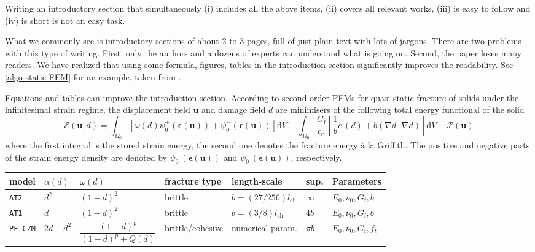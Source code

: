 \documentclass[authoryear,3p,times,preprint,review,fleqn]{elsarticle}
\newcommand{\bfepsilon}{\boldsymbol{\epsilon}}
\newcommand{\bfu}{\boldsymbol{u}}
\newcommand{\td}{\text{d}}
\numberwithin{equation}{section}
\theoremstyle{remark}
\begin{document}
Writing an introductory section that simultaneously (i) includes all the above items, (ii) covers all relevant works, (iii) is easy to follow and (iv) is short is not an easy task.

What we commonly see is introductory sections of about 2 to 3 pages, full of just plain text with lots of jargons. There are two problems with this type of writing. First, only the authors and a dozens of experts can understand what is going on. Second, the paper loses many readers. We have realized that using some formula, figures, tables in the introduction section significantly improves the readability.
See \cref{algo-static-FEM} for an example, taken from \cite{Mandal:EFM2019}.

\begin{MyBox}[label={algo-static-FEM}]
{Equations and tables can improve the introduction section.}
According to second-order PFMs for quasi-static fracture of solids under the infinitesimal strain regime, the displacement field $\bfu$ and damage field $d$ are minimisers of the following total energy functional of the solid 
\begin{equation*}
  \mathscr{E} (\bfu, d) 
    = \int_{\varOmega_{0}} \left[\omega(d)\psi_{0}^+(\bfepsilon (\bfu)) + \psi_{0}^-(\bfepsilon (\bfu)) \right]\td V
    + \int_{\varOmega_{0}}  \frac{G_\text{f}}{c_\alpha} \left[ \frac{1}{b} \alpha(d)
    + b \left( \nabla d \cdot \nabla d \right) \right] \td V
    - \mathscr{P} (\bfu)
\label{eq:3}
\end{equation*}
where the first integral is the stored strain energy, the second one denotes the fracture energy \`a la Griffith. The positive and negative parts of the strain energy density are denoted by $\psi_{0}^+(\bfepsilon (\bfu))$ and $\psi_{0}^-(\bfepsilon (\bfu))$, respectively.\\

 \begin{tabularx}{\textwidth}{lllllll}
   \toprule
 model & $\alpha(d)$ &  $\omega(d)$    & fracture type & length-scale & sup.  & Parameters\\
   \midrule     
  \texttt{AT2} & $d^2$  & $(1 - d)^{2}$  & brittle  & $b=(27/256) l_{\text{ch}}$ & $\infty$ & $E_0,\nu_0,G_\text{f},b$ \\
  \texttt{AT1} & $d$    & $(1 - d)^{2}$ &  brittle  & $b=(3/8) l_{\text{ch}}$ & $4b$  & $E_0,\nu_0,G_\text{f},b$\\
  \texttt{PF-CZM} & $2d-d^2$ & $\dfrac{(1 - d)^p}{(1 - d)^p + Q(d)}$ &  brittle/cohesive  & numerical param. & $\pi b$  & $E_0,\nu_0,G_\text{f},f_t$\\
   \bottomrule
 \end{tabularx}%
\end{MyBox}
\end{document}
